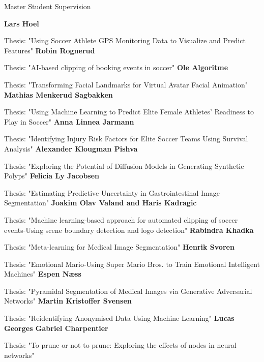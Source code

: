 \begin{rubric}{Master Student Supervision}

    \entry*[2023]%
    \textbf{Lars Hoel} \par
    Thesis: "Using Soccer Athlete GPS Monitoring Data to Visualize and Predict Features"
    \entry*[2023]%
    \textbf{Robin Rognerud} \par
    Thesis: "AI-based clipping of booking events in soccer"
    \entry*[2023]%
    \textbf{Ole Algoritme} \par
    Thesis: "Transforming Facial Landmarks for Virtual Avatar Facial Animation"
    \entry*[2023]%
    \textbf{Mathias Menkerud Sagbakken} \par
    Thesis: "Using Machine Learning to Predict Elite Female Athletes' Readiness to Play in Soccer"
    \entry*[2023]%
    \textbf{Anna Linnea Jarmann} \par
    Thesis: "Identifying Injury Risk Factors for Elite Soccer Teams Using Survival Analysis"
    \entry*[2023]%
    \textbf{Alexander Klougman Pishva} \par
    Thesis: "Exploring the Potential of Diffusion Models in Generating Synthetic Polyps"
    \entry*[2022]%
    \textbf{Felicia Ly Jacobsen} \par
    Thesis: "Estimating Predictive Uncertainty in Gastrointestinal Image Segmentation"
    \entry*[2021]%
    \textbf{Joakim Olav Valand and Haris Kadragic} \par
    Thesis: "Machine learning-based approach for automated clipping of soccer events-Using scene boundary detection and logo detection"
    \entry*[2021]%
    \textbf{Rabindra Khadka} \par
    Thesis: "Meta-learning for Medical Image Segmentation"
    \entry*[2020]%
    \textbf{Henrik Svoren} \par
    Thesis: "Emotional Mario-Using Super Mario Bros. to Train Emotional Intelligent Machines"
    \entry*[2020]%
    \textbf{Espen Næss} \par
    Thesis: "Pyramidal Segmentation of Medical Images via Generative Adversarial Networks"
    \entry*[2020]%
    \textbf{Martin Kristoffer Svensen} \par
    Thesis: "Reidentifying Anonymised Data Using Machine Learning"
    \entry*[2020]%
    \textbf{Lucas Georges Gabriel Charpentier} \par
    Thesis: "To prune or not to prune: Exploring the effects of nodes in neural networks"

\end{rubric}
